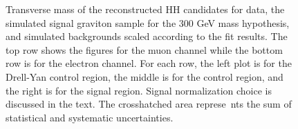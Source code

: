 \begin{figure}[tbp]
\begin{center}
    \caption{Transverse mass of the reconstructed HH candidates for data, the simulated signal graviton sample
    for the 300 GeV mass hypothesis, and simulated backgrounds scaled according to the fit results. The top
    row shows the figures for the muon channel while the bottom row is for the electron channel. For each row,
    the left plot is for the Drell-Yan control region, the middle is for the \ttbar control region, and the right
    is for the signal region. Signal normalization choice is discussed in the text. The crosshatched area represe\
nts
    the sum of statistical and systematic uncertainties.}
    \label{fig:MCcomparisons}
%                                                                                                                 
  \end{center}
\end{figure}




